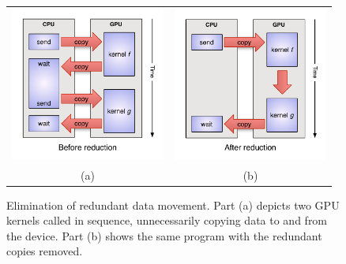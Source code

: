 \begin{figure}[ht]
\centering
\begin{tabular}{cc}
\includegraphics[width=2in]{images/reduction-before}&
\includegraphics[width=2in]{images/reduction-after}\\
(a)&(b)\\
\end{tabular}
\caption{Elimination of redundant data movement. Part (a) depicts two GPU kernels called in sequence, unnecessarily copying data to and from the device. Part (b) shows the same program with the redundant copies removed.}
\label{fig:redundant-movement}
\end{figure}
